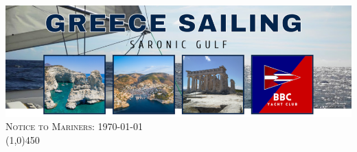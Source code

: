 \documentclass[12pt,a4paper,oneside]{article}
\begin{document}

\begin{center}
\includegraphics[scale=0.5]{../images/saronic_header_small.png} \\[0.2cm]
{\Huge \textsc{Notice to Mariners: \today}}\\
\line(1,0){450}
\end{center}
\end{document}

